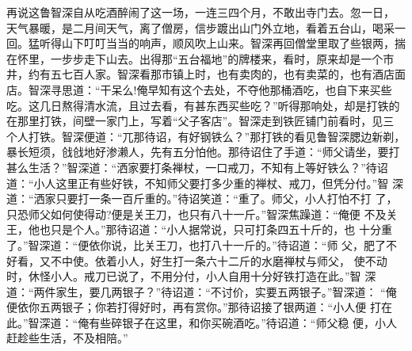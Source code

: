 再说这鲁智深自从吃酒醉闹了这一场，一连三四个月，不敢出寺门去。忽一日，
天气暴暖，是二月间天气，离了僧房，信步踱出山门外立地，看着五台山，喝采一
回。猛听得山下叮叮当当的响声，顺风吹上山来。智深再回僧堂里取了些银两，揣
在怀里，一步步走下山去。出得那“五台福地”的牌楼来，看时，原来却是一个市
井，约有五七百人家。智深看那市镇上时，也有卖肉的，也有卖菜的，也有酒店面
店。智深寻思道：“干呆么!俺早知有这个去处，不夺他那桶酒吃，也自下来买些
吃。这几日熬得清水流，且过去看，有甚东西买些吃？”听得那响处，却是打铁的
在那里打铁，间壁一家门上，写着“父子客店”。智深走到铁匠铺门前看时，见三
个人打铁。智深便道：“兀那待诏，有好钢铁么？”那打铁的看见鲁智深腮边新剃，
暴长短须，戗戗地好渗濑人，先有五分怕他。那待诏住了手道：“师父请坐，要打
甚么生活？”智深道：“洒家要打条禅杖，一口戒刀，不知有上等好铁么？”待诏
道：“小人这里正有些好铁，不知师父要打多少重的禅杖、戒刀，但凭分付。”智
深道：“洒家只要打一条一百斤重的。”待诏笑道：“重了。师父，小人打怕不打
了，只恐师父如何使得动?便是关王刀，也只有八十一斤。”智深焦躁道：“俺便
不及关王，他也只是个人。”那待诏道：“小人据常说，只可打条四五十斤的，也
十分重了。”智深道：“便依你说，比关王刀，也打八十一斤的。”待诏道：“师
父，肥了不好看，又不中使。依着小人，好生打一条六十二斤的水磨禅杖与师父，
使不动时，休怪小人。戒刀已说了，不用分付，小人自用十分好铁打造在此。”智
深道：“两件家生，要几两银子？”待诏道：“不讨价，实要五两银子。”智深道：
“俺便依你五两银子；你若打得好时，再有赏你。”那待诏接了银两道：“小人便
打在此。”智深道：“俺有些碎银子在这里，和你买碗酒吃。”待诏道：“师父稳
便，小人赶趁些生活，不及相陪。”

